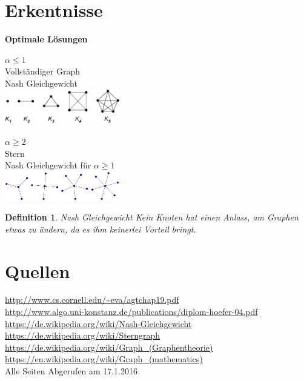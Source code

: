 \documentclass[a4paper]{article}
\newtheorem{Def}{Definition}
\begin{document}
\section{Erkentnisse}
\textbf{Optimale L\"osungen}
\begin{tabbing}
\parbox{5cm}{
\textbf{$\alpha \leq 1$}\\
Vollst\"andiger Graph\\
Nash Gleichgewicht\\
\includegraphics[width=5cm]{pics/Complete_graph_example.png}
}
\parbox{5cm}{
\textbf{$\alpha \geq 2$}\\
Stern\\
Nash Gleichgewicht f\"ur $\alpha \geq 1$ \\
\includegraphics[width=5cm]{pics/star.png}
}
\end{tabbing}
\vspace{1cm}
\begin{Def}
{Nash Gleichgewicht}
Kein Knoten hat einen Anlass, am Graphen etwas zu \"andern, da es ihm keinerlei Vorteil bringt.
\end{Def}
\vspace{1cm}
\section*{Quellen}
\url{http://www.cs.cornell.edu/~eva/agtchap19.pdf}\\
\url{http://www.algo.uni-konstanz.de/publications/diplom-hoefer-04.pdf}\\
\url{https://de.wikipedia.org/wiki/Nash-Gleichgewicht}\\
\url{https://de.wikipedia.org/wiki/Sterngraph}\\
\url{https://de.wikipedia.org/wiki/Graph_(Graphentheorie)}\\
\url{https://en.wikipedia.org/wiki/Graph_(mathematics)}\\
Alle Seiten Abgerufen am 17.1.2016
\end{document}
